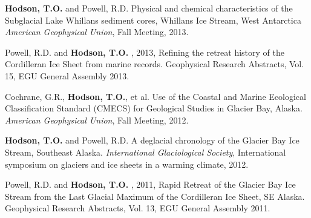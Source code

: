 \textbf{Hodson, T.O.} and Powell, R.D. Physical and chemical characteristics of the Subglacial Lake Whillans sediment cores, Whillans Ice Stream, West Antarctica
\textsl{American Geophysical Union}, Fall Meeting, 2013.

Powell, R.D. and \textbf{Hodson, T.O.} , 2013, Refining the retreat history of the Cordilleran Ice Sheet from marine records. Geophysical Research Abstracts, Vol. 15, EGU General Assembly 2013.

Cochrane, G.R., \textbf{Hodson, T.O.}, et al. Use of the Coastal and Marine Ecological Classification Standard (CMECS) for Geological Studies in Glacier Bay, Alaska.
\textsl{American Geophysical Union}, Fall Meeting, 2012.

\textbf{Hodson, T.O.} and Powell, R.D.  A deglacial chronology of the Glacier Bay Ice Stream, Southeast Alaska.
\textsl{International Glaciological Society}, International symposium on glaciers and ice sheets in a warming climate, 2012.

Powell, R.D. and \textbf{Hodson, T.O.} , 2011, Rapid Retreat of the Glacier Bay Ice Stream from the Last Glacial Maximum of the Cordilleran Ice Sheet, SE Alaska. Geophysical Research Abstracts, Vol. 13, EGU General Assembly 2011.

